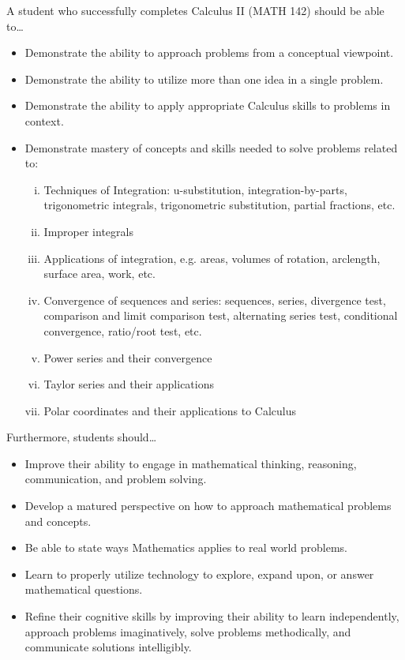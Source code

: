 \documentclass[11pt,letterpaper]{article}
\begin{document}
A student who successfully completes Calculus II (MATH 142) should be able to\dots
	\begin{itemize} \itemsep=0.3ex
	\item Demonstrate the ability to approach problems from a conceptual viewpoint.
	\item Demonstrate the ability to utilize more than one idea in a single problem.
	\item Demonstrate the ability to apply appropriate Calculus skills to problems in context.
	\item Demonstrate mastery of concepts and skills needed to solve problems related to:
		\begin{enumerate}[(i)]
		\item Techniques of Integration: u-substitution, integration-by-parts, trigonometric integrals, trigonometric substitution, partial fractions, etc.
		\item Improper integrals
		\item Applications of integration, e.g. areas, volumes of rotation, arclength, surface area, work, etc.
		\item Convergence of sequences and series: sequences, series, divergence test, comparison and limit comparison test, alternating series test, conditional convergence, ratio/root test, etc.
		\item Power series and their convergence
		\item Taylor series and their applications
		\item Polar coordinates and their applications to Calculus
		\end{enumerate}
	\end{itemize}
Furthermore, students should\dots
	\begin{itemize} \itemsep=0.3ex
	\item  Improve their ability to engage in mathematical thinking, reasoning, communication, and problem solving.
	\item Develop a matured perspective on how to approach mathematical problems and concepts.
	\item Be able to state ways Mathematics applies to real world problems.
	\item Learn to properly utilize technology to explore, expand upon, or answer mathematical questions.
	\item Refine their cognitive skills by improving their ability to learn independently, approach problems imaginatively, solve problems methodically, and communicate solutions intelligibly.
	\end{itemize}
\sectionbreak
\end{document}
